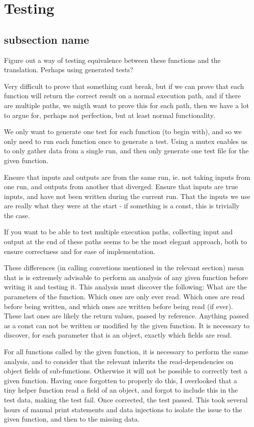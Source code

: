 \section{Testing}
\subsection{subsection name}

Figure out a way of testing equivalence between these functions and the translation. Perhaps using generated tests?

Very difficult to prove that something cant break, but if we can prove that each function will return the correct result on a normal execution path, and if there are multiple paths, we migth want to prove this for each path, then we have a lot to argue for, perhaps not perfection, but at least normal functionality.

We only want to generate one test for each function (to begin with), and so we only need to run each function once to generate a test. Using a mutex enables us to only gather data from a single run, and then only generate one test file for the given function.

Ensure that inputs and outputs are from the same run, ie. not taking inputs from one run, and outputs from another that diverged.
Ensure that inputs are true inputs, and have not been written during the current run. That the inputs we use are really what they were at the start - if something is a const, this is trivially the case.

If you want to be able to test multiple execution paths, collecting input and output at the end of these paths seems to be the most elegant approach, both to ensure correctness and for ease of implementation.

These differences (in calling convetions mentioned in the relevant section) mean that is is extremely advisable to perform an analysis of any given function before writing it and testing it. This analysis must discover the following: What are the parameters of the function. Which ones are only ever read. Which ones are read before being written, and which ones are written before being read (if ever). These last ones are likely the return values, passed by reference. Anything passed as a const can not be written or modified by the given function. It is necessary to discover, for each parameter that is an object, exactly which fields are read.

For all functions called by the given function, it is necessary to perform the same analysis, and to consider that the relevant inherits the read-dependencies on object fields of sub-functions. Otherwise it will not be possible to correctly test a given function. Having once forgotten to properly do this, I overlooked that a tiny helper function read a field of an object, and forgot to include this in the test data, making the test fail. Once corrected, the test passed. This took several hours of manual print statements and data injections to isolate the issue to the given function, and then to the missing data.

